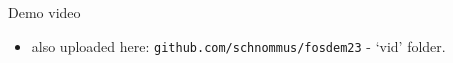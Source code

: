 \documentclass[aspectratio=169]{beamer}
\begin{document}
\begin{frame}{Demo video}
    \begin{itemize}
        \item also uploaded here: \texttt{github.com/schnommus/fosdem23} - `vid' folder.
    \end{itemize}
\end{frame}



\end{document}
